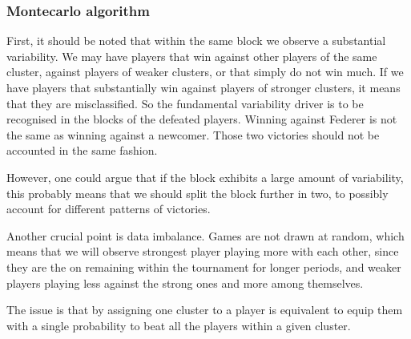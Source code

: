 \documentclass[11pt]{amsart}
\begin{document}
\clearpage

\subsubsection{Montecarlo algorithm}




First, it should be noted that within the same block we observe a substantial variability. We may have players that win against other players of the same cluster, against players of weaker clusters, or that simply do not win much. If we have players that substantially win against players of stronger clusters, it means that they are misclassified. So the fundamental variability driver is to be recognised in the blocks of the defeated players. Winning against Federer is not the same as winning against a newcomer. Those two victories should not be accounted in the same fashion.

However, one could argue that if the block exhibits a large amount of variability, this probably means that we should split the block further in two, to possibly account for different patterns of victories.

Another crucial point is data imbalance. Games are not drawn at random, which means that we will observe strongest player playing more with each other, since they are the on remaining within the tournament for longer periods, and weaker players playing less against the strong ones and more among themselves.

The issue is that by assigning one cluster to a player is equivalent to equip them with a single probability to beat all the players within a given cluster.
\end{document}
